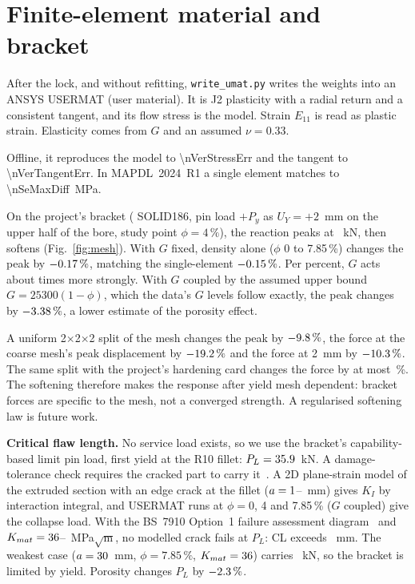 \documentclass[conference]{IEEEtran}
\begin{document}
\section{Finite-element material and bracket}
After the lock, and without refitting, \texttt{write\_umat.py} writes the weights into an ANSYS USERMAT (user material). It is J2 plasticity with a radial return and a consistent tangent, and its flow stress is the model. Strain $E_{11}$ is read as plastic strain. Elasticity comes from $G$ and an assumed $\nu=0.33$.

Offline, it reproduces the model to \num{\nVerStressErr} and the tangent to \num{\nVerTangentErr}. In MAPDL~2024~R1 a single element matches to \num{\nSeMaxDiff}~MPa.

On the project's bracket (\nMeshElemCoarse{} SOLID186, pin load $+P_y$ as $U_Y=+2$~mm on the upper half of the bore, study point $\phi=4\,\%$), the reaction peaks at \nBrUsermatPeakkN~kN, then softens (Fig.~\ref{fig:mesh}). With $G$ fixed, density alone ($\phi$ 0 to 7.85\,\%) changes the peak by $-0.17\,\%$, matching the single-element $-0.15\,\%$. Per percent, $G$ acts about \nPorBrGOverDens{} times more strongly. With $G$ coupled by the assumed upper bound $G=25300(1-\phi)$, which the data's $G$ levels follow exactly, the peak changes by $-3.38\,\%$, a lower estimate of the porosity effect.

A uniform 2$\times$2$\times$2 split of the mesh changes the peak by $-9.8\,\%$, the force at the coarse mesh's peak displacement by $-19.2\,\%$ and the force at 2~mm by $-10.3\,\%$. The same split with the project's hardening card changes the force by at most \nMeshEpMaxChangePct\,\%. The softening therefore makes the response after yield mesh dependent: bracket forces are specific to the mesh, not a converged strength. A regularised softening law is future work.

\textbf{Critical flaw length.} No service load exists, so we use the bracket's capability-based limit pin load, first yield at the R10 fillet: $P_L=35.9$~kN. A damage-tolerance check requires the cracked part to carry it~\cite{cfr25}. A 2D plane-strain model of the extruded section with an edge crack at the fillet ($a=1$--\nClCrackMax~mm) gives $K_I$ by interaction integral, and USERMAT runs at $\phi=0$, 4 and 7.85\,\% ($G$ coupled) give the collapse load. With the BS~7910 Option~1 failure assessment diagram~\cite{bs7910} and $K_{mat}=36$--\nClKmatHigh~MPa$\sqrt{\mathrm m}$, no modelled crack fails at $P_L$: CL exceeds \nClCrackMax~mm. The weakest case ($a=30$~mm, $\phi=7.85\,\%$, $K_{mat}=36$) carries \nClWeakPfkN~kN, so the bracket is limited by yield. Porosity changes $P_L$ by $-2.3\,\%$.
\end{document}
